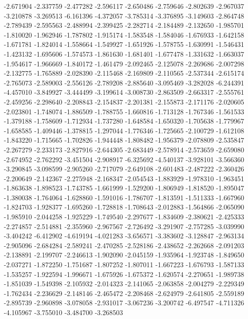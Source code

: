 -2.671904
-2.337759
-2.477282
-2.596117
-2.650486
-2.759646
-2.802639
-2.967037
-3.210878
-3.269513
-6.161396
-4.372057
-3.785314
-3.376895
-3.149603
-2.864748
-2.789439
-2.595563
-2.488994
-2.399425
-2.282714
-2.184489
-2.132650
-1.985701
-1.810020
-1.962946
-1.787802
-1.915174
-1.583548
-1.584046
-1.676933
-1.642158
-1.671781
-1.824014
-1.558664
-1.549927
-1.651926
-1.578755
-1.630991
-1.546431
-1.423132
-1.695606
-1.574573
-1.861630
-1.681401
-1.677478
-1.331632
-1.663037
-1.954617
-1.966669
-1.840172
-1.461479
-2.092465
-2.125078
-2.269686
-2.007298
-2.132775
-1.765889
-2.028390
-2.115468
-2.169809
-2.110565
-2.537344
-2.615174
-2.765073
-2.589003
-2.556126
-2.789208
-2.885640
-3.095469
-3.282028
-6.244391
-4.457010
-3.849927
-3.444499
-3.199614
-3.008730
-2.863509
-2.663317
-2.555761
-2.459256
-2.298640
-2.208843
-2.154837
-2.201381
-2.155873
-2.171176
-2.020605
-2.023801
-1.748074
-1.886509
-1.788755
-1.660816
-1.713128
-1.767346
-1.561533
-1.379188
-1.758609
-1.712934
-1.737280
-1.648584
-1.650320
-1.705638
-1.779967
-1.658585
-1.409446
-1.378815
-1.297044
-1.776346
-1.725665
-2.100729
-1.612108
-1.843220
-1.715665
-1.702826
-1.944448
-1.808482
-1.956379
-2.078809
-2.535847
-2.267279
-2.233173
-2.827916
-2.644305
-2.683449
-2.578914
-2.573659
-2.659080
-2.674952
-2.762292
-3.451504
-2.908917
-6.325692
-4.540137
-3.928101
-3.566360
-3.290845
-3.098599
-2.905260
-2.717079
-2.649108
-2.601483
-2.487222
-2.360426
-2.200649
-2.142367
-2.275948
-2.168347
-2.054543
-1.883929
-1.978310
-1.963451
-1.863638
-1.898523
-1.743785
-1.661999
-1.529200
-1.806949
-1.818520
-1.895047
-1.380038
-1.764064
-1.628860
-1.591016
-1.786707
-1.813591
-1.511333
-1.667960
-1.824703
-1.928377
-1.695260
-1.728818
-1.708643
-2.012883
-1.564866
-2.065090
-1.985910
-2.044258
-1.925229
-1.749540
-2.297677
-1.834609
-2.380621
-2.425333
-2.274857
-2.514881
-2.355960
-2.967567
-2.726492
-3.291907
-2.757285
-3.039990
-3.404242
-6.412902
-4.619194
-4.021283
-3.656571
-3.383602
-3.128847
-2.963134
-2.905096
-2.684284
-2.589241
-2.470285
-2.528186
-2.438652
-2.262668
-2.091203
-2.138891
-2.199707
-2.246613
-1.902090
-2.045159
-1.935964
-1.923748
-1.849650
-2.037271
-1.872250
-1.751687
-1.807252
-1.807011
-1.667223
-1.676793
-1.587133
-1.535257
-1.922594
-1.996671
-1.675926
-1.675372
-1.620574
-2.270651
-1.989738
-1.851039
-1.549398
-2.105932
-2.014323
-2.141065
-2.063858
-2.004279
-2.229349
-1.762434
-2.236629
-2.148146
-2.465472
-2.208468
-2.624979
-2.641805
-2.559189
-2.895739
-2.960898
-3.078058
-2.931017
-3.067236
-3.200742
-6.497547
-4.711326
-4.105967
-3.755010
-3.484700
-3.268503
